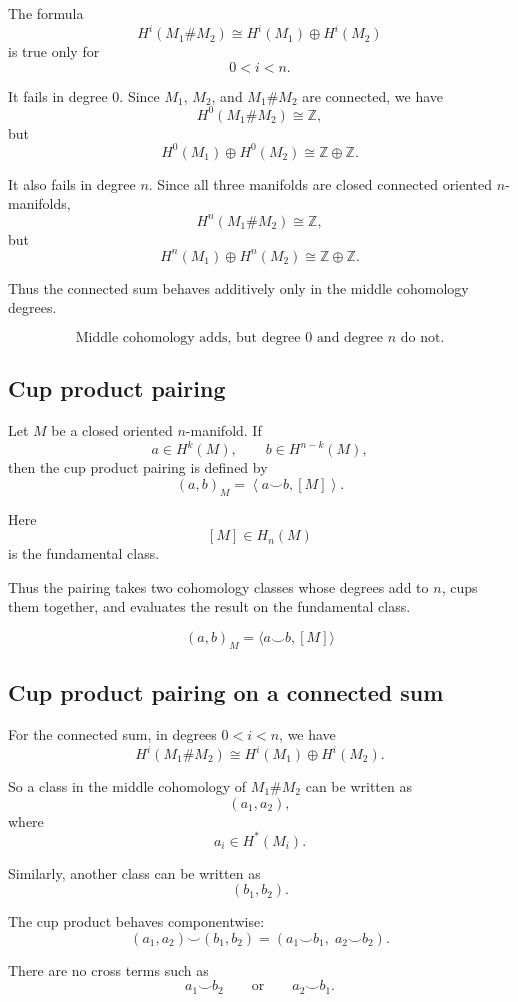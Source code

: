 \documentclass[12pt,a4paper]{article}
\theoremstyle{notespace}
\begin{document}
The formula
\[
H^i(M_1\#M_2)
\cong
H^i(M_1)\oplus H^i(M_2)
\]
is true only for
\[
0<i<n.
\]

It fails in degree \(0\). Since \(M_1\), \(M_2\), and \(M_1\#M_2\) are connected,
we have
\[
H^0(M_1\#M_2)\cong \mathbb{Z},
\]
but
\[
H^0(M_1)\oplus H^0(M_2)
\cong
\mathbb{Z}\oplus \mathbb{Z}.
\]

It also fails in degree \(n\). Since all three manifolds are closed connected
oriented \(n\)-manifolds,
\[
H^n(M_1\#M_2)\cong \mathbb{Z},
\]
but
\[
H^n(M_1)\oplus H^n(M_2)
\cong
\mathbb{Z}\oplus \mathbb{Z}.
\]

Thus the connected sum behaves additively only in the middle cohomology
degrees.

\[
\boxed{
	\text{Middle cohomology adds, but degree }0\text{ and degree }n\text{ do not.}
}
\]

\subsection{Cup product pairing}

Let \(M\) be a closed oriented \(n\)-manifold. If
\[
a\in H^k(M),
\qquad
b\in H^{n-k}(M),
\]
then the cup product pairing is defined by
\[
(a,b)_M
=
\left\langle
a\smile b,[M]
\right\rangle.
\]

Here
\[
[M]\in H_n(M)
\]
is the fundamental class.

Thus the pairing takes two cohomology classes whose degrees add to \(n\),
cups them together, and evaluates the result on the fundamental class.

\[
\boxed{
	(a,b)_M
	=
	\langle a\smile b,[M]\rangle
}
\]

\subsection{Cup product pairing on a connected sum}

For the connected sum, in degrees \(0<i<n\), we have
\[
H^i(M_1\#M_2)
\cong
H^i(M_1)\oplus H^i(M_2).
\]

So a class in the middle cohomology of \(M_1\#M_2\) can be written as
\[
(a_1,a_2),
\]
where
\[
a_i\in H^*(M_i).
\]

Similarly, another class can be written as
\[
(b_1,b_2).
\]

The cup product behaves componentwise:
\[
(a_1,a_2)\smile (b_1,b_2)
=
(a_1\smile b_1,\;a_2\smile b_2).
\]

There are no cross terms such as
\[
a_1\smile b_2
\qquad\text{or}\qquad
a_2\smile b_1.
\]
\end{document}
